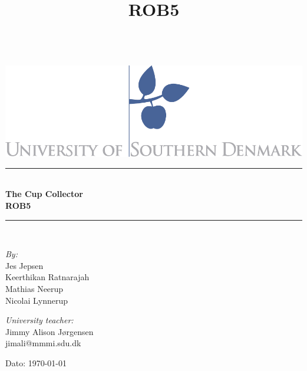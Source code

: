 \documentclass[11pt,a4paper]{article}
\title{ROB5}
\begin{document}
\begin{titlepage}
\begin{center}

\textsc{\Large }\\[0.5cm]
\vfill
\includegraphics[scale=0.4]{img/SDU}\\[1cm]
\hrule ~\\[0.3cm]
{ \huge \bfseries The Cup Collector \\ROB5\\[0.4cm] }
\hrule ~\\[1.5cm]
\vfill

\begin{minipage}[t]{7.9cm}
\begin{flushleft} \large
\emph{By:}\\
Jes Jepsen  \\
Keerthikan Ratnarajah\\
Mathias Neerup\\
Nicolai Lynnerup \\
\end{flushleft}
\end{minipage}
\begin{minipage}[t]{7.9cm}
\begin{flushright} \large
\emph{University teacher:} \\
Jimmy Alison Jørgensen \\
jimali@mmmi.sdu.dk
\end{flushright}
\end{minipage}

\vspace{1.2cm}
Dato: \today


\end{center}
\end{titlepage}

\tableofcontents
\newpage

\newpage
\end{document}
